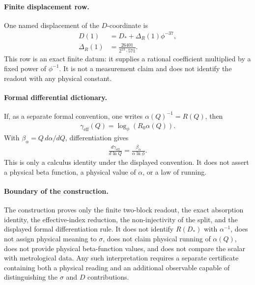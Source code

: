 \paragraph{Finite displacement row.}
One named displacement of the $D$-coordinate is
$$
\begin{aligned}
D(1)&=D_\ast+\Delta_R(1)\phi^{-37},\\
\Delta_R(1)&=\frac{26401}{2^{13}\cdot 571}.
\end{aligned}
$$
This row is an exact finite datum: it supplies a rational coefficient multiplied by a fixed power of $\phi^{-1}$. It is not a measurement claim and does not identify the readout with any physical constant.

\paragraph{Formal differential dictionary.}
If, as a separate formal convention, one writes $\alpha(Q)^{-1}=R(Q)$, then
$$
\begin{aligned}
\gamma_{\mathrm{eff}}(Q)=\log_\phi(R_0\alpha(Q)).
\end{aligned}
$$
With $\beta_\alpha=Q\,d\alpha/dQ$, differentiation gives
$$
\begin{aligned}
\frac{d\gamma_{\mathrm{eff}}}{d\ln Q}=\frac{\beta_\alpha}{\alpha\ln\phi}.
\end{aligned}
$$
This is only a calculus identity under the displayed convention. It does not assert a physical beta function, a physical value of $\alpha$, or a law of running.

\paragraph{Boundary of the construction.}
The construction proves only the finite two-block readout, the exact absorption identity, the effective-index reduction, the non-injectivity of the split, and the displayed formal differentiation rule. It does not identify $R(D_\ast)$ with $\alpha^{-1}$, does not assign physical meaning to $\sigma$, does not claim physical running of $\alpha(Q)$, does not provide physical beta-function values, and does not compare the scalar with metrological data. Any such interpretation requires a separate certificate containing both a physical reading and an additional observable capable of distinguishing the $\sigma$ and $D$ contributions.
